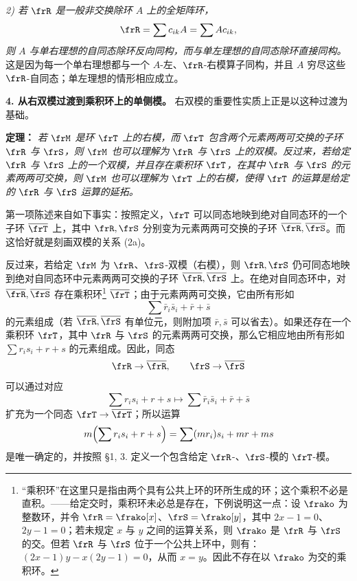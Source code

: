 \emph{2) 若 \(\frR\) 是一般非交换除环 \(A\) 上的全矩阵环，}
\[
        \frR=\sum c_{ik}A=\sum A c_{ik},
\]
\emph{则 \(A\) 与单右理想的自同态除环反向同构，而与单左理想的自同态除环直接同构。} 这是因为每一个单右理想都与一个 \(A\)-左、\(\frR\)-右模算子同构，并且 \(A\) 穷尽这些 \(\frR\)-自同态；单左理想的情形相应成立。

\noindent\textbf{4. 从右双模过渡到乘积环上的单侧模。} 右双模的重要性实质上正是以这种过渡为基础。

\noindent\textbf{定理：} \emph{若 \(\frM\) 是环 \(\frT\) 上的右模，而 \(\frT\) 包含两个元素两两可交换的子环 \(\frR\) 与 \(\frS\)，则 \(\frM\) 也可以理解为 \(\frR\) 与 \(\frS\) 上的双模。反过来，若给定 \(\frR\) 与 \(\frS\) 上的一个双模，并且存在乘积环 \(\frT\)，在其中 \(\frR\) 与 \(\frS\) 的元素两两可交换，则 \(\frM\) 也可以理解为 \(\frT\) 上的右模，使得 \(\frT\) 的运算是给定的 \(\frR\) 与 \(\frS\) 运算的延拓。}

第一项陈述来自如下事实：按照定义，\(\frT\) 可以同态地映到绝对自同态环的一个子环 \(\overline{\frT}\) 上，其中 \(\frR,\frS\) 分别变为元素两两可交换的子环 \(\overline{\frR},\overline{\frS}\)。而这恰好就是刻画双模的关系 (2a)。

反过来，若给定 \(\frM\) 为 \(\frR\)、\(\frS\)-双模（右模），则 \(\frR,\frS\) 仍可同态地映到绝对自同态环中元素两两可交换的子环 \(\overline{\frR},\overline{\frS}\) 上。在绝对自同态环中，对 \(\overline{\frR},\overline{\frS}\) 存在乘积环\footnote{“乘积环”在这里只是指由两个具有公共上环的环所生成的环；这个乘积不必是直积。——给定交时，乘积环未必总是存在，下例说明这一点：设 \(\frako\) 为整数环，并令 \(\frR=\frako[x]\)、\(\frS=\frako[y]\)，其中 \(2x-1=0\)、\(2y-1=0\)；若未规定 \(x\) 与 \(y\) 之间的运算关系，则 \(\frako\) 是 \(\frR\) 与 \(\frS\) 的交。但若 \(\frR\) 与 \(\frS\) 位于一个公共上环中，则有：\((2x-1)y-x(2y-1)=0\)，从而 \(x=y\)。因此不存在以 \(\frako\) 为交的乘积环。} \(\overline{\frT}\)；由于元素两两可交换，它由所有形如
\[
        \sum \bar r_i\bar s_i+\bar r+\bar s
\]
的元素组成（若 \(\overline{\frR},\overline{\frS}\) 有单位元，则附加项 \(\bar r,\bar s\) 可以省去）。如果还存在一个乘积环 \(\frT\)，其中 \(\frR\) 与 \(\frS\) 的元素两两可交换，那么它相应地由所有形如 \(\sum r_i s_i+r+s\) 的元素组成。因此，同态
\[
        \frR\to\overline{\frR},\qquad \frS\to\overline{\frS}
\]
可以通过对应
\[
        \sum r_i s_i+r+s
        \longmapsto
        \sum \bar r_i\bar s_i+\bar r+\bar s
\]
扩充为一个同态 \(\frT\to\overline{\frT}\)；所以运算
\[
        m\Bigl(\sum r_i s_i+r+s\Bigr)
        =\sum (m r_i)s_i+m r+m s
\]
是唯一确定的，并按照 §1, 3. 定义一个包含给定 \(\frR\)-、\(\frS\)-模的 \(\frT\)-模。

